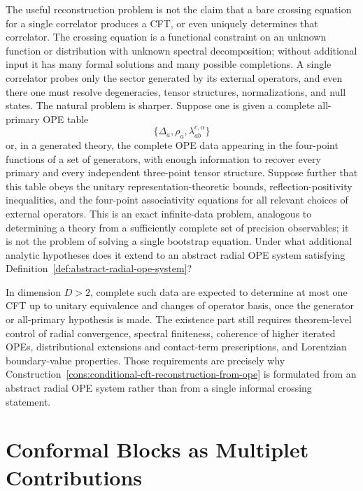 \begin{openproblem}
\label{op:bootstrap-completeness-from-ope-data}
The useful reconstruction problem is not the claim that a bare crossing
equation for a single correlator produces a CFT, or even uniquely determines
that correlator.  The crossing equation is a functional constraint on an
unknown function or distribution with unknown spectral decomposition; without
additional input it has many formal solutions and many possible completions.
A single correlator probes only the sector generated by its external
operators, and even there one must resolve degeneracies, tensor structures,
normalizations, and null states.  The natural problem is sharper.  Suppose
one is given a complete all-primary OPE table
\[
  \{\Delta_a,\rho_a,\lambda_{ab}^{c,\alpha}\}
\]
or, in a generated theory, the complete OPE data appearing in the four-point
functions of a set of generators, with enough information to recover every
primary and every independent three-point tensor structure.  Suppose further
that this table obeys the unitary representation-theoretic bounds,
reflection-positivity inequalities, and the four-point associativity
equations for all relevant choices of external operators.  This is an exact
infinite-data problem, analogous to determining a theory from a sufficiently
complete set of precision observables; it is not the problem of solving a
single bootstrap equation.  Under what additional analytic hypotheses does
it extend to an abstract radial OPE system satisfying
Definition~\ref{def:abstract-radial-ope-system}?

In dimension \(D>2\), complete such data are expected to determine at most one
CFT up to unitary equivalence and changes of operator basis, once the
generator or all-primary hypothesis is made.  The existence part still
requires theorem-level control of radial convergence, spectral finiteness,
coherence of higher iterated OPEs, distributional extensions and contact-term
prescriptions, and Lorentzian boundary-value properties.  Those requirements
are precisely why Construction~\ref{cons:conditional-cft-reconstruction-from-ope}
is formulated from an abstract radial OPE system rather than from a single
informal crossing statement.
\end{openproblem}

\section{Conformal Blocks as Multiplet Contributions}

